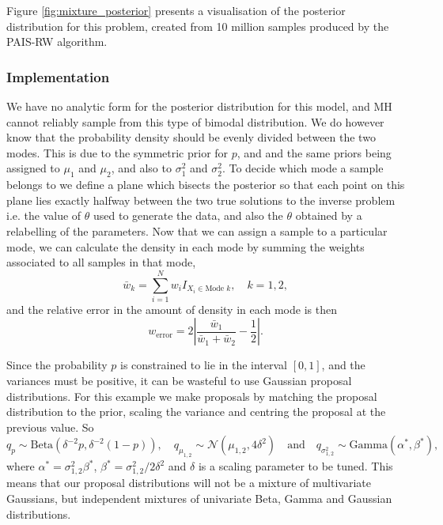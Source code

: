 \documentclass[final]{siamltex}
\begin{document}
Figure \ref{fig:mixture_posterior} presents a visualisation of the
posterior distribution for this problem, created from 10 million
samples produced by the PAIS-RW algorithm.


\subsubsection{Implementation}
\label{sec:mixture_implementation}

We have no analytic form for the posterior distribution for this
model, and MH cannot reliably sample from this type of bimodal
distribution. We do however know that the probability density should
be evenly divided between the two modes. This is due to the symmetric
prior for $p$, and and the same priors being assigned to $\mu_1$ and
$\mu_2$, and also to $\sigma^2_1$ and $\sigma^2_2$. To decide which
mode a sample belongs to we define a plane which bisects the posterior
so that each point on this plane lies exactly halfway between the two
true solutions to the inverse problem i.e. the value of $\theta$ used
to generate the data, and also the $\theta$ obtained by a relabelling
of the parameters. Now that we can assign a sample to a particular
mode, we can calculate the density in each mode by summing the weights
associated to all samples in that mode,
\[
	\bar{w}_k = \sum\limits_{i=1}^N w_iI_{X_i \in \text{Mode $k$}}, \quad k = 1, 2,
\]
and the relative error in the amount of density in each mode is then
\begin{equation}\label{eqn:mode_prop}
	w_\text{error} = 2\left|\frac{\bar{w}_1}{\bar{w}_1+\bar{w}_2} - \frac{1}{2}\right|.
\end{equation}

Since the probability $p$ is constrained to lie in the interval
$[0,1]$, and the variances must be positive, it can be wasteful to use
Gaussian proposal distributions. For this example we make proposals by
matching the proposal distribution to the prior, scaling the variance
and centring the proposal at the previous value. So
\[
	q_p \sim \text{Beta}(\delta^{-2}p, \delta^{-2}(1-p)), \quad q_{\mu_{1,2}} \sim \mathcal{N}(\mu_{1,2}, 4\delta^2) \quad \text{and} \quad q_{\sigma^2_{1,2}} \sim \text{Gamma}(\alpha^*, \beta^*),
\]
where $\alpha^* = \sigma^2_{1,2}\beta^*$, $\beta^* =
\sigma^2_{1,2}/2\delta^2$ and $\delta$ is a scaling parameter to be
tuned. This means that our proposal distributions will not be a
mixture of multivariate Gaussians, but independent mixtures of
univariate Beta, Gamma and Gaussian distributions.
\end{document}
